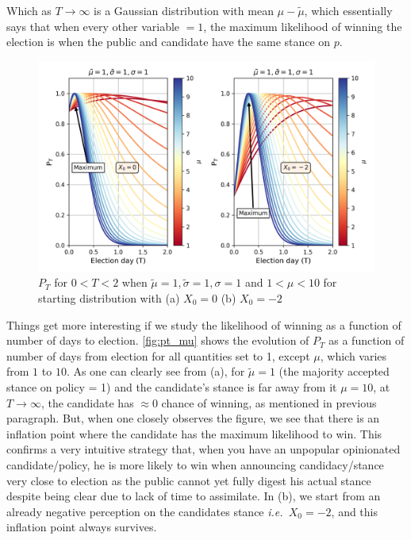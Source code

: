 \documentclass[aps,prl,twocolumn,showpacs,final]{revtex4-1}
\newcommand{\ie}{\textit{i.e.\ }}
\begin{document}
Which as $T\rightarrow \infty$ is a Gaussian distribution with mean $\mu-\tilde{\mu}$, which essentially says that when every other variable $=1$, the maximum likelihood of winning the election is when the public and candidate have the same stance on $p$.

\begin{figure}[htbp]
\includegraphics[width=\columnwidth]{pt_mu.png}
\caption{ $P_T$ for $0<T<2$ when $\tilde{\mu}=1,\tilde{\sigma}=1,\sigma=1$ and $1<\mu<10$ for starting distribution with (a) $X_0=0$ (b) $X_0=-2$ }
\label{fig:pt_mu}
\end{figure}

Things get more interesting if we study the likelihood of winning as a function of number of days to election. \autoref{fig:pt_mu} shows the evolution of $P_T$ as a function of number of days from election for all quantities set to 1, except $\mu$, which varies from $1$ to $10$. As one can clearly see from (a), for $\tilde{\mu}=1$ (the majority accepted stance on policy = 1) and the candidate's stance is far away from it $\mu=10$, at $T\rightarrow\infty$, the candidate has $\approx0$ chance of winning, as mentioned in previous paragraph. But, when one closely observes the figure, we see that there is an inflation point where the candidate has the maximum likelihood to win. This confirms a very intuitive strategy that, when you have an unpopular opinionated candidate/policy, he is more likely to win when announcing candidacy/stance very close to election as the public cannot yet fully digest his actual stance despite being clear due to lack of time to assimilate. In (b), we start from an already negative perception on the candidates stance \ie $X_0=-2$, and this inflation point always survives.
\end{document}
